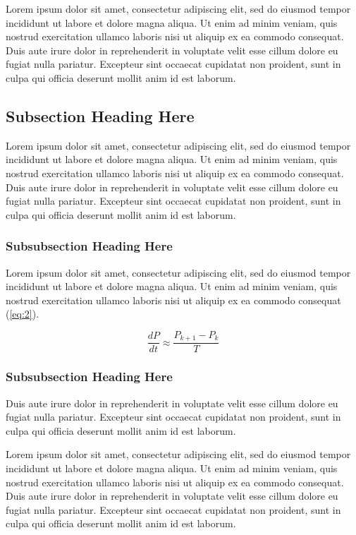 Lorem ipsum dolor sit amet, consectetur adipiscing elit, sed do eiusmod tempor incididunt ut labore et dolore magna aliqua. Ut enim ad minim veniam, quis nostrud exercitation ullamco laboris nisi ut aliquip ex ea commodo consequat. Duis aute irure dolor in reprehenderit in voluptate velit esse cillum dolore eu fugiat nulla pariatur. Excepteur sint occaecat cupidatat non proident, sunt in culpa qui officia deserunt mollit anim id est laborum.

\subsection{Subsection Heading Here}
Lorem ipsum dolor sit amet, consectetur adipiscing elit, sed do eiusmod tempor incididunt ut labore et dolore magna aliqua. Ut enim ad minim veniam, quis nostrud exercitation ullamco laboris nisi ut aliquip ex ea commodo consequat. Duis aute irure dolor in reprehenderit in voluptate velit esse cillum dolore eu fugiat nulla pariatur. Excepteur sint occaecat cupidatat non proident, sunt in culpa qui officia deserunt mollit anim id est laborum.


\subsubsection{Subsubsection Heading Here}

Lorem ipsum dolor sit amet, consectetur adipiscing elit, sed do eiusmod tempor incididunt ut labore et dolore magna aliqua. Ut enim ad minim veniam, quis nostrud exercitation ullamco laboris nisi ut aliquip ex ea commodo consequat (\ref{eq:2}).

\begin{equation} \label{eq:2}
	\frac{{dP}}{{dt}} \approx \frac{{P_{k + 1}  - P_k }}{T}
\end{equation}

\subsubsection{Subsubsection Heading Here}

 Duis aute irure dolor in reprehenderit in voluptate velit esse cillum dolore eu fugiat nulla pariatur. Excepteur sint occaecat cupidatat non proident, sunt in culpa qui officia deserunt mollit anim id est laborum.

Lorem ipsum dolor sit amet, consectetur adipiscing elit, sed do eiusmod tempor incididunt ut labore et dolore magna aliqua. Ut enim ad minim veniam, quis nostrud exercitation ullamco laboris nisi ut aliquip ex ea commodo consequat. Duis aute irure dolor in reprehenderit in voluptate velit esse cillum dolore eu fugiat nulla pariatur. Excepteur sint occaecat cupidatat non proident, sunt in culpa qui officia deserunt mollit anim id est laborum.

